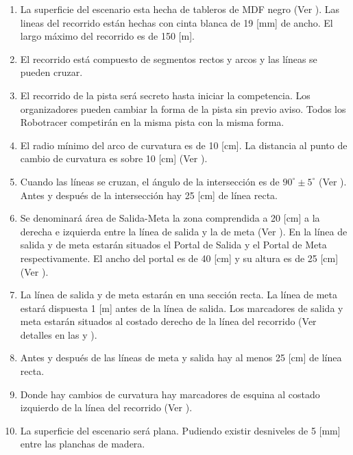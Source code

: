\begin{enumerate}
  \item La superficie del escenario esta hecha de tableros de MDF negro (Ver ). Las lineas del recorrido están hechas con cinta blanca de 19 [mm] de ancho. El largo máximo del recorrido es de 150 [m].

  \item El recorrido está compuesto de segmentos rectos y arcos y las líneas se pueden cruzar.

  \item El recorrido de la pista será secreto hasta iniciar la competencia. Los organizadores pueden cambiar la forma de la pista sin previo aviso. Todos los Robotracer competirán en la misma pista con la misma forma.

  \item El radio mínimo del arco de curvatura es de 10 [cm]. La distancia al punto de cambio de curvatura es sobre 10 [cm] (Ver ).

  \item Cuando las líneas se cruzan, el ángulo de la intersección es de $90^\circ \pm 5^\circ$ (Ver ). Antes y después de la intersección hay 25 [cm] de línea recta.

  \item Se denominará área de Salida-Meta la zona comprendida a 20 [cm] a la derecha e izquierda entre la línea de salida y la de meta (Ver ). En la línea de salida y de meta estarán situados el Portal de Salida y el Portal de Meta respectivamente. El ancho del portal es de 40 [cm] y su altura es de 25 [cm] (Ver ).

  \item La línea de salida y de meta estarán en una sección recta. La línea de meta estará dispuesta 1 [m] antes de la línea de salida. Los marcadores de salida y meta estarán situados al costado derecho de la línea del recorrido (Ver detalles en las  y ).

  \item Antes y después de las líneas de meta y salida hay al menos 25 [cm] de línea recta.

  \item Donde hay cambios de curvatura hay marcadores de esquina al costado izquierdo de la línea del recorrido (Ver ). 

  \item La superficie del escenario será plana. Pudiendo existir desniveles de 5 [mm] entre las planchas de madera.


\end{enumerate}
